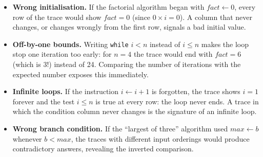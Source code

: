 \documentclass[11pt]{article}
\begin{document}
\begin{itemize}
\item \textbf{Wrong initialisation.} If the factorial algorithm began with $fact \leftarrow 0$, every row of the trace would show $fact = 0$ (since $0 \times i = 0$). A column that never changes, or changes wrongly from the first row, signals a bad initial value.
\item \textbf{Off-by-one bounds.} Writing \texttt{while} $i < n$ instead of $i \leq n$ makes the loop stop one iteration too early: for $n = 4$ the trace would end with $fact = 6$ (which is $3!$) instead of 24. Comparing the number of iterations with the expected number exposes this immediately.
\item \textbf{Infinite loops.} If the instruction $i \leftarrow i + 1$ is forgotten, the trace shows $i = 1$ forever and the test $i \leq n$ is true at every row: the loop never ends. A trace in which the condition column never changes is the signature of an infinite loop.
\item \textbf{Wrong branch condition.} If the ``largest of three'' algorithm used $max \leftarrow b$ whenever $b < max$, the traces with different input orderings would produce contradictory answers, revealing the inverted comparison.
\end{itemize}
\end{document}
